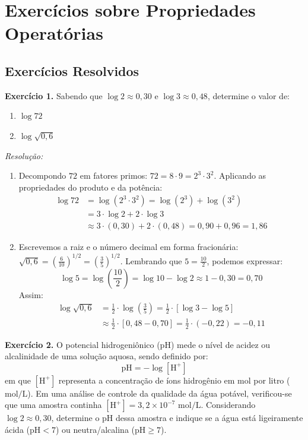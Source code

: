 \documentclass[12pt,a4paper]{report}
\begin{document}
	\section{Exercícios sobre Propriedades Operatórias}
	
	\subsection{Exercícios Resolvidos}
	
	\textbf{Exercício 1.} Sabendo que $\log 2 \approx 0{,}30$ e $\log 3 \approx 0{,}48$, determine o valor de:
	\begin{enumerate}[label=\textbf{\alph*)}]
		\item $\log 72$
		\item $\log \sqrt{0{,}6}$
	\end{enumerate}
	
	\textit{Resolução:}
	\begin{enumerate}[label=\textbf{\alph*)}]
		\item Decompondo $72$ em fatores primos: $72 = 8 \cdot 9 = 2^3 \cdot 3^2$.  
		Aplicando as propriedades do produto e da potência:
		\begin{align*}
			\log 72 &= \log(2^3 \cdot 3^2) = \log(2^3) + \log(3^2) \\
			&= 3 \cdot \log 2 + 2 \cdot \log 3 \\
			&\approx 3 \cdot (0{,}30) + 2 \cdot (0{,}48) = 0{,}90 + 0{,}96 = 1{,}86
		\end{align*}
		
		\item Escrevemos a raiz e o número decimal em forma fracionária: $\sqrt{0{,}6} = \left(\frac{6}{10}\right)^{1/2} = \left(\frac{3}{5}\right)^{1/2}$.  
		Lembrando que $5 = \frac{10}{2}$, podemos expressar:
		$$\log 5 = \log\left(\frac{10}{2}\right) = \log 10 - \log 2 \approx 1 - 0{,}30 = 0{,}70$$
		Assim:
		\begin{align*}
			\log \sqrt{0{,}6} &= \frac{1}{2} \cdot \log\left(\frac{3}{5}\right) = \frac{1}{2} \cdot [\log 3 - \log 5] \\
			&\approx \frac{1}{2} \cdot [0{,}48 - 0{,}70] = \frac{1}{2} \cdot (-0{,}22) = -0{,}11
		\end{align*}
	\end{enumerate}
	
	\vspace{0.3cm}
	
	\textbf{Exercício 2.}  O potencial hidrogeniônico ($\text{pH}$) mede o nível de acidez ou alcalinidade de uma solução aquosa, sendo definido por:
	$$\text{pH} = -\log [\text{H}^+]$$
	em que $[\text{H}^+]$ representa a concentração de íons hidrogênio em mol por litro ($\text{mol/L}$).  
	Em uma análise de controle da qualidade da água potável, verificou-se que uma amostra continha $[\text{H}^+] = 3{,}2 \times 10^{-7}\text{ mol/L}$. Considerando $\log 2 \approx 0{,}30$, determine o $\text{pH}$ dessa amostra e indique se a água está ligeiramente ácida ($\text{pH} < 7$) ou neutra/alcalina ($\text{pH} \geqslant 7$).
	
\end{document}
